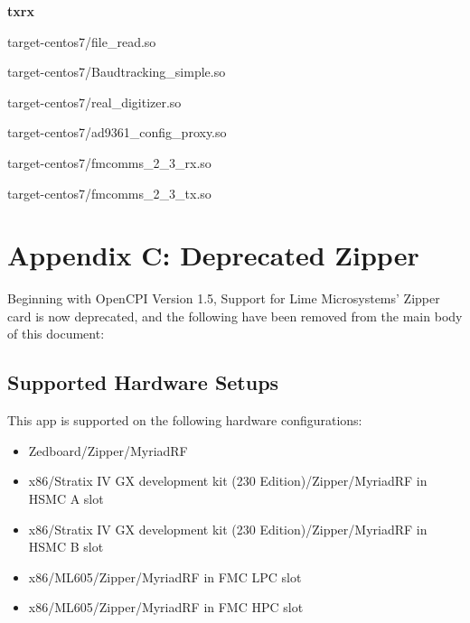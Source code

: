 	\noindent\textbf{txrx} %
	\begin{itemize}
	\begin{minipage}[t]{.5\textwidth}
	\item target-centos7/file\_read.so
	\item target-centos7/Baudtracking\_simple.so
	\item target-centos7/real\_digitizer.so
	\end{minipage}
	\begin{minipage}[t]{.5\textwidth}
	\item target-centos7/ad9361\_config\_proxy.so
	\item target-centos7/fmcomms\_2\_3\_rx.so
	\item target-centos7/fmcomms\_2\_3\_tx.so
	\end{minipage}
	\end{itemize}







\section{Appendix C: Deprecated Zipper}
Beginning with OpenCPI Version 1.5, Support for Lime Microsystems' Zipper card is now deprecated, and the following have been removed from the main body of this document:\medskip

\subsection{Supported Hardware Setups}
This app is supported on the following hardware configurations:
\begin{itemize}
  \item Zedboard/Zipper/MyriadRF
  \item x86/Stratix IV GX development kit (230 Edition)/Zipper/MyriadRF in HSMC A slot
  \item x86/Stratix IV GX development kit (230 Edition)/Zipper/MyriadRF in HSMC B slot
  \item x86/ML605/Zipper/MyriadRF in FMC LPC slot
  \item x86/ML605/Zipper/MyriadRF in FMC HPC slot
\end{itemize}


